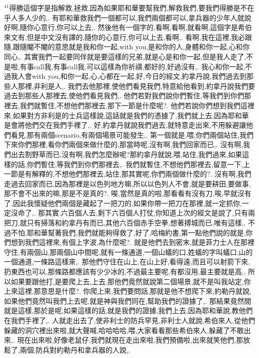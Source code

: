 \documentclass{book}
\begin{document}
$^{41}$得勝這個字是指解救,拯救,因為如果耶和華要幫我們,解救我們,要我們得勝是不在乎人多人少的,.
有耶和華救我們一個都可以,我們兩個都可以,拿兵器的少年人就說好啊,隨你心意行,你可以上去,.
然後他有一個字的,看啊,看啊,就看啊,這個字是希伯來文有,但是中文沒有譯的,隨你的心意行,你可以上去,看啊,.
看啊,我在這裡,我必跟隨,跟隨閹不閹的意思就是我和你一起,with you,是和你的人,身體和你一起,心和你同心,.
其實我們一起要同伴就是要這樣的兄弟,就是心是和你一起,但是我人走了,不是啦,有事call我,有事call我,可以這樣為你祈禱,都好的,好過沒有,.
我心和你一起,不過我人會with you,和你一起,心,心都在一起,好,今日的經文,約拿丹說,我們過去到那些人那裡,非利是人,.
我們去他那裡,使他們看見我們,特意給他看到,約拿丹說我們要過去到那些人那裡去,使他們看見我們,.
他們若對我們說你們暫住,等我們到你們那裡去,我們就暫住,不想他們那裡去,那下一節是什麼呢?.
他們若說你們想到我們這裡來,如果對方非利是的士兵這樣說,這話就是我們的憑據了,我們就上去,因為耶和華是會將他們交在我們手裡了,.
好,約拿丹就說我們過去,就特意走出來,不用躲避讓他們看見,那有兩個scenario,有兩個場景可能發生,.
第一個就是,喂,你們兩個站住,我們下來你們那裡,看你們兩個來做什麼的,那當時呢,沒有啊,我們回家而已,.
沒有啊,我們出去割野草而已,沒有啊,我們怎麼辦呢?那約拿丹就說,喂,站住,我們過來,如果這樣的話,你們暫住,等我們到你們那裡去,.
我們就暫住,不想他們那裡去,留意一下,上一節是有解釋的,不想他們那裡去,站住,那其實呢,你們兩個做什麼的?.
沒有啊,我們走過去回家而已,因為那裡是以色列地方嘛,所以以色列人不會,就是要耕田,要做事,那不會不出來的嘛,那是不是真的?.
唉,當然是真的啦,那看看有沒有刀,唉,早就沒有了,因此我懷疑他們兩個是藏起了一把刀的,如果你帶一把刀在那裡,就一定抓你,一定沒命了,.
那其實,六百個人去,剩下六百個人打仗,你知道上次的經文是說了,只有兩把刀,就只有掃落和約拿丹有而已,其他六百個赤手空拳,想著搏城而已,唯有這樣,.
不過不怕,耶和華幫著我們,我們就能夠得救了,好了,哈梅約書,第一點他們說的就是,你們想到我們這裡來,有個上字波,為什麼呢?.
就是他們去到密末,就是菲力士人在那裡守住,有兩個山,那兩個山中間呢,就有一條通道,一個山蟻的口,姓蟻的字叫蟻口,山的一個通道,一條路這樣來,.
那他們守住在山上,在山上好,看得遠,而且可以射箭下來,扔東西也可以,那條路都應該有少少冰的,不過最主要呢,有都沒用,最主要就是高,.
所以如果要跟他打,是要爬上去,上去,那他們竟然就說第二個場景,就不是叫我站定,你上來這裡,那意思是什麼?.
你爬上來,我們要問話,那就是他不想爬下來,約勒丹就說,如果他們竟然叫我們上去呢,就是神與我們同在,幫助我們的證據了,.
那結果竟然間就是這樣,那於是呢,如果這樣的話,就是我們的證據,我們上去,因為耶和華說,教他們在我們手裡了,.
人就走出去了,使非利士的防兵罕見,非利士人就說,希伯來人,從他們躲藏的洞穴裡出來啦,就大聲喊,哈哈哈哈,喂,大家看看那些希伯來人,躲藏了不敢出來,.
現在出來啦,好像老鼠仔,我們就現在走出來啦,我們預備啦,出來就笑他們,那放鬆了,兩個,防兵對約勒丹和拿兵器的人說,.
\end{document}
